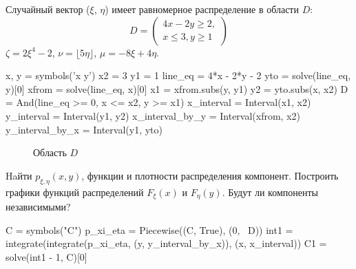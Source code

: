 
\renewcommand*{\proofname}{Решение}

Случайный вектор ($\xi$, $\eta$) имеет равномерное распределение в области $D$:
\[
  D=\begin{pmatrix}4x-2y\geqslant2,\\x\leqslant3,y\geqslant1\end{pmatrix}
\]
$\zeta=2\xi^4-2$, $\nu=\lfloor5\eta\rfloor$, $\mu= -8\xi+4\eta$.

\begin{sympycode}
x, y = symbols('x y')
x2 = 3
y1 = 1
line_eq = 4*x - 2*y - 2
yto = solve(line_eq, y)[0]
xfrom = solve(line_eq, x)[0]
x1 = xfrom.subs(y, y1)
y2 = yto.subs(x, x2)
D = And(line_eq >= 0, x <= x2, y >= x1)
x_interval = Interval(x1, x2)
y_interval = Interval(y1, y2)
x_interval_by_y = Interval(xfrom, x2)
y_interval_by_x = Interval(y1, yto)
\end{sympycode}

\begin{figure}[h!]
  \centering
  \caption{Область $D$}
  \label{fig:D}
\end{figure}

\begin{problem}
Haйти $p_{\xi, \eta} ( x, y) $, функции и плотности распределения компонент. Построить графики функций распределений $F_\xi(x)$ и $F_\eta(y)$. Будут ли компоненты независимыми?
\end{problem}

\begin{sympycode}
C = symbols("C")
p_xi_eta = Piecewise((C, True), (0, ~D))
int1 = integrate(integrate(p_xi_eta, (y, y_interval_by_x)), (x, x_interval))
C1 = solve(int1 - 1, C)[0]
\end{sympycode}

